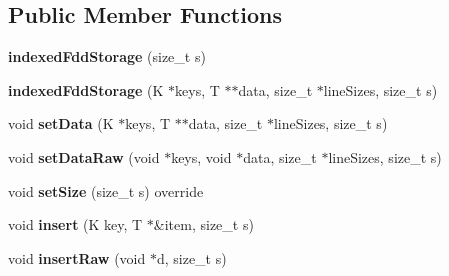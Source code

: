 \subsection*{Public Member Functions}
\begin{DoxyCompactItemize}
\item 
\hypertarget{classfaster_1_1indexedFddStorage_3_01K_00_01T_01_5_01_4_a0ad6ad05d9ccd4601ce2718827e295c1}{}{\bfseries indexed\+Fdd\+Storage} (size\+\_\+t s)\label{classfaster_1_1indexedFddStorage_3_01K_00_01T_01_5_01_4_a0ad6ad05d9ccd4601ce2718827e295c1}

\item 
\hypertarget{classfaster_1_1indexedFddStorage_3_01K_00_01T_01_5_01_4_a95c98e657a0443c3d384d897a4f8cb35}{}{\bfseries indexed\+Fdd\+Storage} (K $\ast$keys, T $\ast$$\ast$data, size\+\_\+t $\ast$line\+Sizes, size\+\_\+t s)\label{classfaster_1_1indexedFddStorage_3_01K_00_01T_01_5_01_4_a95c98e657a0443c3d384d897a4f8cb35}

\item 
\hypertarget{classfaster_1_1indexedFddStorage_3_01K_00_01T_01_5_01_4_a1f25a359fc75622309cb7f181d8545ef}{}void {\bfseries set\+Data} (K $\ast$keys, T $\ast$$\ast$data, size\+\_\+t $\ast$line\+Sizes, size\+\_\+t s)\label{classfaster_1_1indexedFddStorage_3_01K_00_01T_01_5_01_4_a1f25a359fc75622309cb7f181d8545ef}

\item 
\hypertarget{classfaster_1_1indexedFddStorage_3_01K_00_01T_01_5_01_4_a20ede574def362eae00630166dd6ca10}{}void {\bfseries set\+Data\+Raw} (void $\ast$keys, void $\ast$data, size\+\_\+t $\ast$line\+Sizes, size\+\_\+t s)\label{classfaster_1_1indexedFddStorage_3_01K_00_01T_01_5_01_4_a20ede574def362eae00630166dd6ca10}

\item 
\hypertarget{classfaster_1_1indexedFddStorage_3_01K_00_01T_01_5_01_4_ab26b5b1dc0eea07fb002f7144defcaa5}{}void {\bfseries set\+Size} (size\+\_\+t s) override\label{classfaster_1_1indexedFddStorage_3_01K_00_01T_01_5_01_4_ab26b5b1dc0eea07fb002f7144defcaa5}

\item 
\hypertarget{classfaster_1_1indexedFddStorage_3_01K_00_01T_01_5_01_4_a2bff285398ff9e7eb830b2a966643679}{}void {\bfseries insert} (K key, T $\ast$\&item, size\+\_\+t s)\label{classfaster_1_1indexedFddStorage_3_01K_00_01T_01_5_01_4_a2bff285398ff9e7eb830b2a966643679}

\item 
\hypertarget{classfaster_1_1indexedFddStorage_3_01K_00_01T_01_5_01_4_aeedf936a68804ea1f9e0b287ec786a74}{}void {\bfseries insert\+Raw} (void $\ast$d, size\+\_\+t s)\label{classfaster_1_1indexedFddStorage_3_01K_00_01T_01_5_01_4_aeedf936a68804ea1f9e0b287ec786a74}


\end{DoxyCompactItemize}
